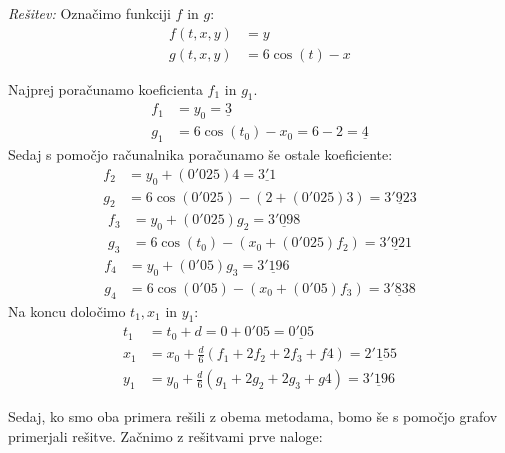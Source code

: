 \documentclass[a4paper, 10pt]{article}
\newenvironment{resitev}{\begin{flushleft}\textit{Rešitev:}}{\hfill\end{flushleft}}
\begin{document}
			\begin{resitev}
				Označimo funkciji $f$ in $g$:
				\begin{align*}
					f(t, x, y) &= y \\
					g(t, x, y) &= 6\cos(t) - x
				\end{align*}
				
				Najprej poračunamo koeficienta $f_1$ in $g_1$. \begin{align*}
					f_1 &= y_0 = \underline{3}\\
					g_1 &= 6\cos(t_0) - x_0 = 6 - 2 = \underline{4}
				\end{align*}
				Sedaj s pomočjo računalnika poračunamo še ostale koeficiente:
				\begin{align*} 
					f_2 &= y_0 + (0'025)4=\underline{3'1} \\
					g_2 &= 6\cos(0'025) - (2 + (0'025)3)=\underline{3'923}
				\end{align*} 
				\begin{align*}
					f_3 &= y_0 + (0'025)g_2 =\underline{3'098} \\
					g_3 &= 6\cos(t_0) - (x_0 + (0'025)f_2)=\underline{3'921}
				\end{align*}
				\begin{align*} 
					f_4 &= y_0 + (0'05)g_3 =\underline{3'196}\\
					g_4 &= 6\cos(0'05) - (x_0 + (0'05)f_3)=\underline{3'838}
				\end{align*}
				Na koncu določimo $t_1, x_1$ in $y_1$: \begin{align*}
					t_1 &= t_0 + d = 0 + 0'05 = \underline{0'05} \\
					x_1 &= x_0 + \frac{d}{6}(f_1 + 2f_2 + 2f_3 + f4)= \underline{2'155}\\
					y_1 &= y_0 + \frac{d}{6}(g_1 + 2g_2 + 2g_3 + g4)= \underline{3'196}
				\end{align*}
			\end{resitev}
			
		Sedaj, ko smo oba primera rešili z obema metodama, bomo še s pomočjo grafov primerjali rešitve. Začnimo z rešitvami prve naloge:
		
\end{document}
